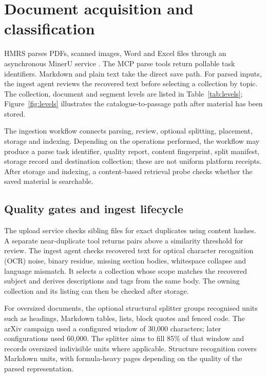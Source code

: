 \section{Document acquisition and classification}
\label{sec:acquisition}

HMRS parses PDFs, scanned images, Word and Excel files through
an asynchronous MinerU service \citep{mineru}. The MCP parse tools return
pollable task identifiers. Markdown and plain text take the direct save
path. For parsed inputs, the ingest agent reviews the recovered text
before selecting a collection by topic. The collection, document and segment
levels are listed in Table~\ref{tab:levels}; Figure~\ref{fig:levels}
illustrates the catalogue-to-passage path after material has been stored.

The ingestion workflow connects parsing, review, optional splitting,
placement, storage and indexing. Depending on the operations performed,
the workflow may produce a parse task identifier, quality report, content
fingerprint, split manifest, storage record and destination collection; these
are not uniform platform receipts. After storage and indexing, a content-based retrieval probe
checks whether the saved material is searchable.

\subsection{Quality gates and ingest lifecycle}

The upload service checks sibling files for exact duplicates using content
hashes. A separate near-duplicate tool returns pairs above a similarity
threshold for review. The ingest agent checks recovered text for
optical character recognition (OCR) noise,
binary residue, missing section bodies, whitespace collapse and language
mismatch. It selects a collection whose scope matches the recovered subject and
derives descriptions and tags from the same body. The owning collection and
its listing can then be checked after storage.

For oversized documents, the optional structural splitter groups recognised
units such as headings, Markdown tables, lists, block quotes and fenced code.
The arXiv campaign used a configured window of 30,000 characters; later configurations used
60,000. The splitter aims to fill 85\% of that window and records
oversized indivisible units where applicable. Structure recognition covers
Markdown units, with formula-heavy pages depending on the quality of the
parsed representation.


